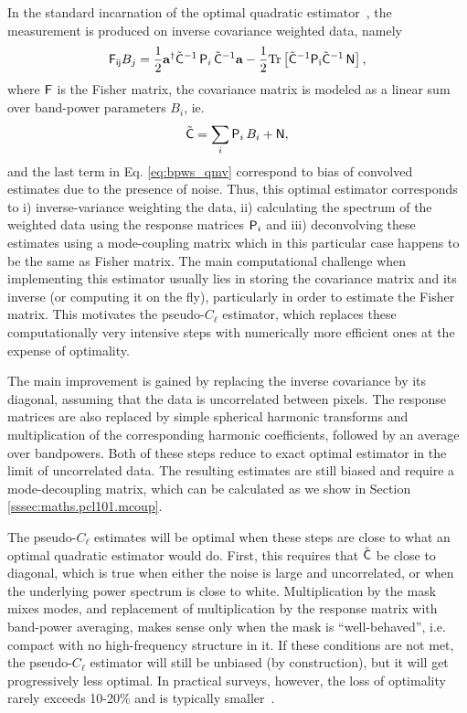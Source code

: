 \documentclass[usenatbib]{mnrasb}
\newcommand{\va}{{\mathbf{a}}}
\begin{document}
        In the standard incarnation of the optimal quadratic estimator~\citep{1998PhRvD..57.2117B}, the measurement is produced on inverse covariance weighted data, namely
        \begin{equation}
          {\sf F_{ij}} B_j = \frac{1}{2}\va^\dagger \tilde{\sf C}^{-1}\,{\sf P}_i\,\tilde{\sf C}^{-1} \va -
          \frac{1}{2}\rm{Tr}\left[\tilde{\sf C}^{-1}{\sf P}_i\tilde{\sf C}^{-1}\,{\sf N} \right],
        \end{equation}
        where ${\sf F}$ is the Fisher matrix, the covariance matrix is modeled as a linear sum over band-power parameters $B_i$, ie.
        \begin{equation}\label{eq:bpws_qmv}
          \tilde{\sf C} = \sum_i {\sf P}_i\,B_i + {\sf N},
        \end{equation}
        and the last term in Eq. \ref{eq:bpws_qmv} correspond to bias of convolved estimates due to the presence of noise. Thus, this optimal estimator corresponds to i) inverse-variance weighting the data, ii) calculating the spectrum of the weighted data using the response matrices ${\sf P}_i$ and iii) deconvolving these estimates using a mode-coupling matrix which in this particular case happens to be the same as Fisher matrix. The main computational challenge when implementing this estimator usually lies in storing the covariance matrix and its inverse (or computing it on the fly), particularly in order to estimate the Fisher matrix. This motivates the pseudo-$C_\ell$ estimator, which replaces these computationally very intensive steps with numerically more efficient ones at the expense of optimality.

        The main improvement is gained by replacing the inverse covariance by its diagonal, assuming that the data is uncorrelated between pixels. The response matrices are also replaced by simple spherical harmonic transforms and multiplication of the corresponding harmonic coefficients, followed by an average over bandpowers. Both of these steps reduce to exact optimal estimator in the limit of uncorrelated data. The resulting estimates are still biased and require a mode-decoupling matrix, which can be calculated as we show in Section \ref{sssec:maths.pcl101.mcoup}. 

        The pseudo-$C_\ell$ estimates will be optimal when these steps are close to what an optimal quadratic estimator would do. First, this requires that $\tilde{\sf C}$ be close to diagonal, which is true when either the noise is large and uncorrelated, or when the underlying power spectrum is close to white. Multiplication by the mask mixes modes, and replacement of multiplication by the response matrix with band-power averaging, makes sense only when the mask is ``well-behaved'', i.e. compact with no high-frequency structure in it. If these conditions are not met, the pseudo-$C_\ell$ estimator will still be unbiased (by construction), but it will get progressively less optimal. In practical surveys, however, the loss of optimality rarely exceeds 10-20\% and is typically smaller~\citep{2013MNRAS.435.1857L}.
\end{document}
